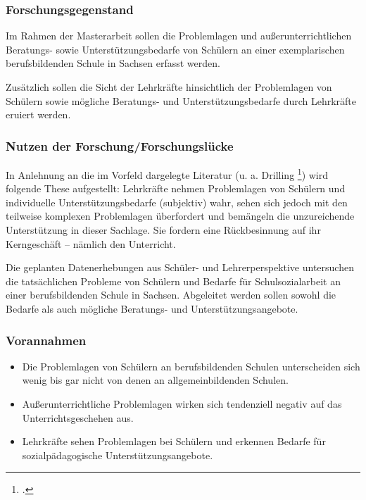 \subsubsection{Forschungsgegenstand}
\label{sec:Forschungsgegenstand}

Im Rahmen der Masterarbeit sollen die Problemlagen und außerunterrichtlichen Be\-rat\-ungs- sowie Unterstützungsbedarfe von Schülern an einer exemplarischen berufsbildenden Schule in Sachsen erfasst werden.

Zusätzlich sollen die Sicht der Lehrkräfte hinsichtlich der Problemlagen von Schülern sowie mögliche Beratungs- und Unterstützungsbedarfe durch Lehrkräfte eruiert werden.

\subsubsection{Nutzen der Forschung/Forschungslücke}
\label{sec:NutzenDerForschungForschungslücke}

In Anlehnung an die im Vorfeld dargelegte Literatur (u. a. Drilling \footcite[vgl.][10]{Drilling2004}) wird folgende These aufgestellt: Lehrkräfte nehmen Problemlagen von Schülern und individuelle Unterstützungsbedarfe (subjektiv) wahr, sehen sich jedoch mit den teilweise komplexen Problemlagen überfordert und bemängeln die unzureichende Unterstützung in dieser Sachlage. Sie fordern eine Rückbesinnung auf ihr Kerngeschäft -- nämlich den Unterricht.

Die geplanten Datenerhebungen aus Schüler- und Lehrerperspektive untersuchen die tatsächlichen Probleme von Schülern und Bedarfe für Schulsozialarbeit an einer berufsbildenden Schule in Sachsen. Abgeleitet werden sollen sowohl die Bedarfe als auch mögliche Beratungs- und Unterstützungsangebote.

\subsubsection{Vorannahmen}
\label{sec:Vorannahmen}

\begin{itemize}
	\item Die Problemlagen von Schülern an berufsbildenden Schulen unterscheiden sich wenig bis gar nicht von denen an allgemeinbildenden Schulen.
	\item Außerunterrichtliche Problemlagen wirken sich tendenziell negativ auf das Unterrichtsgeschehen aus.
	\item Lehrkräfte sehen Problemlagen bei Schülern und erkennen Bedarfe für sozialpädagogische Unterstützungsangebote. 
\end{itemize}

